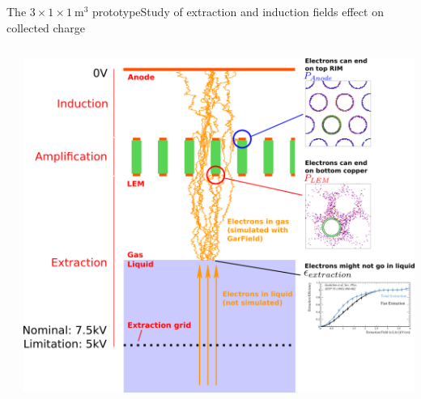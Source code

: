 \documentclass[10pt]{beamer}
\begin{document}
\begin{frame}{The \texorpdfstring{$3 \times 1 \times \SI{1}{\meter\cubed}$}{311} prototype}{Study of extraction and induction fields effect on collected charge}
\begin{scriptsize}
\begin{columns}
\begin{column}{0.35\textwidth}
	    		\end{column}\hspace{-1.9cm}
	    		\begin{column}{0.65\textwidth}
	    			\includegraphics[width=1.18\textwidth]{figures/311/coll_proba_2.png}\\
	    		\end{column}
	    	\end{columns}
    	\end{scriptsize} 
    \end{frame}
    
\end{document}
